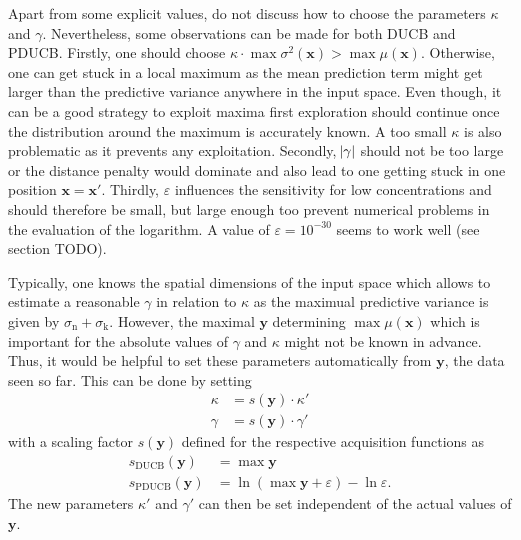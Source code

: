 \documentclass[11pt,a4paper]{scrreprt}
\newcommand{\vc}[1]{\bm{#1}}
\newcommand{\ped}[1]{_{\mathrm{#1}}}
\begin{document}
Apart from some explicit values, \textcite{Marchant:2012wb} do not discuss how 
to choose the parameters $\kappa$ and $\gamma$. Nevertheless, some observations 
can be made for both DUCB and PDUCB\@. Firstly, one should choose $\kappa \cdot 
\max \sigma^2(\vc x) > \max \mu(\vc x)$. Otherwise, one can get stuck in a local 
maximum as the mean prediction term might get larger than the predictive 
variance anywhere in the input space. Even though, it can be a good strategy to 
exploit maxima first exploration should continue once the distribution around 
the maximum is accurately known. A too small $\kappa$ is also problematic as it 
prevents any exploitation. Secondly, $\abs{\gamma}$ should not be too large or 
the distance penalty would dominate and also lead to one getting stuck in one 
position $\vc x = \vc x'$. Thirdly, $\varepsilon$ influences the sensitivity for 
low concentrations and should therefore be small, but large enough too prevent 
numerical problems in the evaluation of the logarithm. A value of $\varepsilon 
= 10^{-30}$ seems to work well (see section TODO).

Typically, one knows the spatial dimensions of the input space which allows to 
estimate a reasonable $\gamma$ in relation to $\kappa$ as the maximual 
predictive variance is given by $\sigma\ped{n} + \sigma\ped{k}$.  However, the 
maximal $\vc y$ determining $\max \mu(\vc x)$ which is important for the 
absolute values of $\gamma$ and $\kappa$ might not be known in advance.  Thus, 
it would be helpful to set these parameters automatically from $\vc y$, the data 
seen so far.  This can be done by setting
\begin{align}
    \kappa &= s(\vc y) \cdot \kappa' \\
    \gamma &= s(\vc y) \cdot \gamma'
\end{align}
with a scaling factor $s(\vc y)$ defined for the respective acquisition 
functions as
\begin{align}
    s\ped{DUCB}(\vc y) &= \max \vc y \\
    s\ped{PDUCB}(\vc y) &= \ln(\max \vc y + \varepsilon) - \ln \varepsilon 
    \text{.}
\end{align}
The new parameters $\kappa'$ and $\gamma'$ can then be set independent of the 
actual values of $\vc y$.
\end{document}
